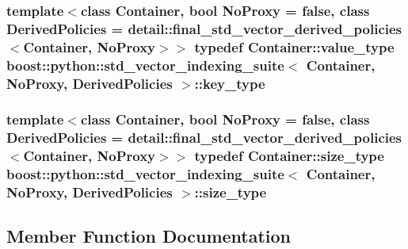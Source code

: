 \subsubsection[{key\+\_\+type}]{\setlength{\rightskip}{0pt plus 5cm}template$<$class Container, bool No\+Proxy = false, class Derived\+Policies = detail\+::final\+\_\+std\+\_\+vector\+\_\+derived\+\_\+policies$<$\+Container, No\+Proxy$>$$>$ typedef Container\+::value\+\_\+type {\bf boost\+::python\+::std\+\_\+vector\+\_\+indexing\+\_\+suite}$<$ Container, No\+Proxy, Derived\+Policies $>$\+::{\bf key\+\_\+type}}\label{classboost_1_1python_1_1std__vector__indexing__suite_aad8e15443d4d920d6b15e1781fba568a}
\hypertarget{classboost_1_1python_1_1std__vector__indexing__suite_af582d879611acb090b6d227a64914cc6}{}
\subsubsection[{size\+\_\+type}]{\setlength{\rightskip}{0pt plus 5cm}template$<$class Container, bool No\+Proxy = false, class Derived\+Policies = detail\+::final\+\_\+std\+\_\+vector\+\_\+derived\+\_\+policies$<$\+Container, No\+Proxy$>$$>$ typedef Container\+::size\+\_\+type {\bf boost\+::python\+::std\+\_\+vector\+\_\+indexing\+\_\+suite}$<$ Container, No\+Proxy, Derived\+Policies $>$\+::{\bf size\+\_\+type}}\label{classboost_1_1python_1_1std__vector__indexing__suite_af582d879611acb090b6d227a64914cc6}


\subsection{Member Function Documentation}
\hypertarget{classboost_1_1python_1_1std__vector__indexing__suite_a317a62cce09e40822e7c376cd6afc7b4}{}

